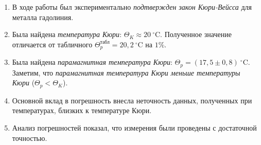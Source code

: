 \documentclass[a4paper, 12pt]{article}
\begin{document}
    \begin{enumerate}
        \item В ходе работы был экспериментально \textit{подтвержден закон Кюри-Вейсса} для металла гадолиния. 
        
        \item Была найдена \textit{температура Кюри}: $\Theta_K \approx 20 \: ^\circ$C. Полученное значение отличается от табличного $\Theta_p^\text{табл} = 20,2 \: ^\circ$C на $1 \%$.

        \item Была найдена \textit{парамагнитная температура Кюри}: $\Theta_p = \left( 17,5 \pm 0,8 \right) \: ^{\circ}$C. Заметим, что \textit{парамагнитная температура Кюри меньше температуры Кюри} ($\Theta_p < \Theta_K$).

        \item Основной вклад в погрешность внесла неточность данных, полученных при температурах, близких к температуре Кюри.

        \item Анализ погрешностей показал, что измерения были проведены с достаточной точностью.
    \end{enumerate}
\end{document}
